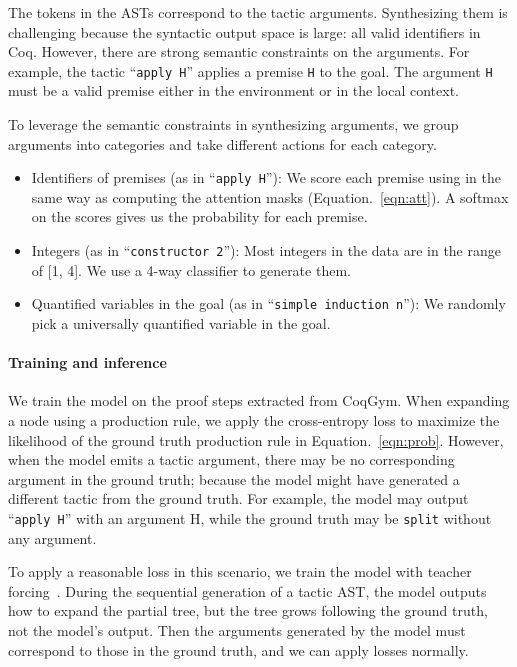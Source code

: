 \documentclass{article}
\newcommand{\smallsec}[1]{\vspace{-3mm} \paragraph{#1}}
\newcommand{\datasetname}{CoqGym}
\begin{document}
The tokens in the ASTs correspond to the tactic arguments.
Synthesizing them is challenging because the syntactic output space is large:
all valid identifiers in Coq.
However, there are strong semantic constraints on the arguments.
For example, the tactic ``\texttt{apply H}'' applies a premise \texttt{H} to the goal.
The argument \texttt{H} must be a valid premise either in the environment or in the local context.

To leverage the semantic constraints in synthesizing arguments, we group arguments into categories and take different actions for each category.



\begin{itemize}

\item Identifiers of premises (as in ``\texttt{apply H}''): We score each premise using  in the same way as computing the attention masks (Equation.~\ref{eqn:att}).
A softmax on the scores gives us the probability for each premise.



\item Integers (as in ``\texttt{constructor 2}''): Most integers in the data are in the range of [1, 4]. 
We use a 4-way classifier to generate them.


\item Quantified variables in the goal (as in ``\texttt{simple induction n}''): We randomly pick a universally quantified variable in the goal.


\end{itemize}


\smallsec{Training and inference}
We train the model on the proof steps extracted from \datasetname.
When expanding a node using a production rule, we apply the cross-entropy loss to maximize the likelihood of the ground truth production rule in Equation.~\ref{eqn:prob}.
However, when the model emits a tactic argument, there may be no corresponding argument in the ground truth;
because the model might have generated a different tactic from the ground truth.
For example, the model may output ``\texttt{apply H}'' with an argument H, while the ground truth may be \texttt{split} without any argument.

To apply a reasonable loss in this scenario, we train the model with teacher forcing~\cite{williams1989learning}.
During the sequential generation of a tactic AST, the model outputs how to expand the partial tree, but the tree grows following the ground truth, not the model's output. 
Then the arguments generated by the model must correspond to those in the ground truth,
and we can apply losses normally.
\end{document}
